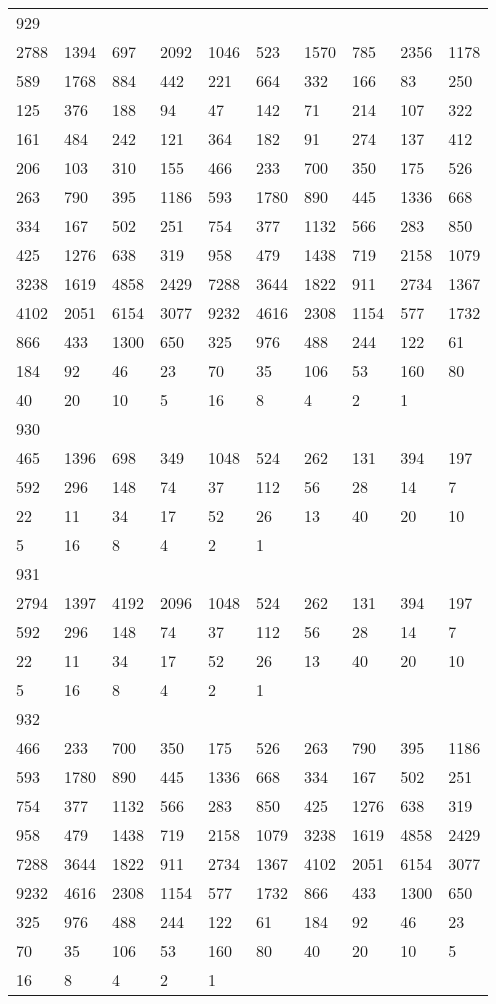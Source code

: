 \begin{longtable}{*{10}{l}}
929&&&&&&&&&\\
2788& 1394& 697& 2092& 1046& 523& 1570& 785& 2356& 1178\\
589& 1768& 884& 442& 221& 664& 332& 166& 83& 250\\
125& 376& 188& 94& 47& 142& 71& 214& 107& 322\\
161& 484& 242& 121& 364& 182& 91& 274& 137& 412\\
206& 103& 310& 155& 466& 233& 700& 350& 175& 526\\
263& 790& 395& 1186& 593& 1780& 890& 445& 1336& 668\\
334& 167& 502& 251& 754& 377& 1132& 566& 283& 850\\
425& 1276& 638& 319& 958& 479& 1438& 719& 2158& 1079\\
3238& 1619& 4858& 2429& 7288& 3644& 1822& 911& 2734& 1367\\
4102& 2051& 6154& 3077& 9232& 4616& 2308& 1154& 577& 1732\\
866& 433& 1300& 650& 325& 976& 488& 244& 122& 61\\
184& 92& 46& 23& 70& 35& 106& 53& 160& 80\\
40& 20& 10& 5& 16& 8& 4& 2& 1& \\

930&&&&&&&&&\\
465& 1396& 698& 349& 1048& 524& 262& 131& 394& 197\\
592& 296& 148& 74& 37& 112& 56& 28& 14& 7\\
22& 11& 34& 17& 52& 26& 13& 40& 20& 10\\
5& 16& 8& 4& 2& 1& \\

931&&&&&&&&&\\
2794& 1397& 4192& 2096& 1048& 524& 262& 131& 394& 197\\
592& 296& 148& 74& 37& 112& 56& 28& 14& 7\\
22& 11& 34& 17& 52& 26& 13& 40& 20& 10\\
5& 16& 8& 4& 2& 1& \\

932&&&&&&&&&\\
466& 233& 700& 350& 175& 526& 263& 790& 395& 1186\\
593& 1780& 890& 445& 1336& 668& 334& 167& 502& 251\\
754& 377& 1132& 566& 283& 850& 425& 1276& 638& 319\\
958& 479& 1438& 719& 2158& 1079& 3238& 1619& 4858& 2429\\
7288& 3644& 1822& 911& 2734& 1367& 4102& 2051& 6154& 3077\\
9232& 4616& 2308& 1154& 577& 1732& 866& 433& 1300& 650\\
325& 976& 488& 244& 122& 61& 184& 92& 46& 23\\
70& 35& 106& 53& 160& 80& 40& 20& 10& 5\\
16& 8& 4& 2& 1& \\


\end{longtable}
